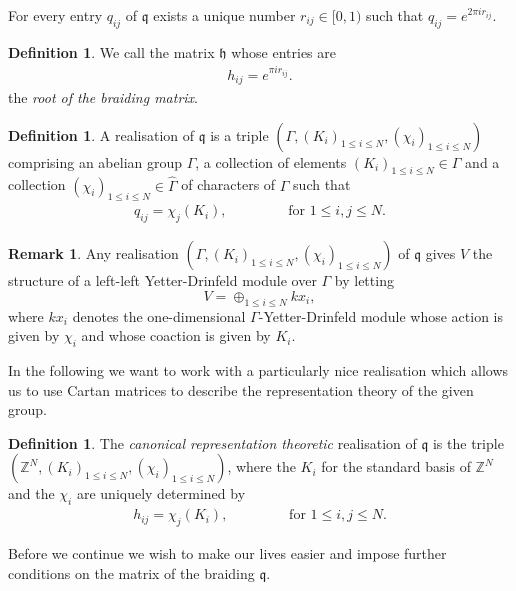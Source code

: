 \documentclass{amsart}
\theoremstyle{definition}
\newtheorem{definition}[theorem]{Definition}
\newtheorem*{remark}{Remark}
\begin{document}
For every entry $q_{ij}$ of $\mathfrak q$ exists a unique number $r_{ij}\in [0,1)$ such that $q_{ij}= e^{2\pi i r_{ij}}$. 

\begin{definition}
	We call the matrix $\mathfrak h$ whose entries are
	\begin{align}
		h_{ij} =  e^{\pi i r_{ij}}.
	\end{align}
	the \emph{root of the braiding matrix}. 
\end{definition}

\begin{definition}
	A realisation of $\mathfrak q$ is a triple $(\Gamma, (K_i)_{1\leq i \leq N}, (\chi_i)_{1 \leq i \leq N})$ comprising an abelian group $\Gamma$, a collection of elements $(K_i)_{1 \leq i \leq N} \in \Gamma$ and a collection  $(\chi_i)_{1 \leq i \leq N} \in \widehat \Gamma$ of characters of $\Gamma$ such that
	\begin{align}
		q_{ij} = \chi_j(K_i), \qquad \qquad \text{ for } 1 \leq i,j \leq N.
	\end{align}
\end{definition}

\begin{remark}
	Any realisation $(\Gamma, (K_i)_{1\leq i \leq N}, (\chi_i)_{1 \leq i \leq N})$ of $\mathfrak q$ gives $V$ the structure of a left-left Yetter-Drinfeld module over $\Gamma$ by letting
	$$
		V= \oplus_{1 \leq i \leq N} kx_i,
	$$
	where $kx_i$ denotes the one-dimensional $\Gamma$-Yetter-Drinfeld module whose action is given by $\chi_i$ and whose coaction is given by $K_i$.
\end{remark}

In the following we want to work with a particularly nice realisation which allows us to use Cartan matrices to describe the representation theory of the given group.
\begin{definition}
	The \emph{canonical representation theoretic} realisation of $\mathfrak q$ is the triple $(\mathbb Z^N,(K_i)_{1\leq i \leq N}, (\chi_i)_{1 \leq i \leq N})$, where
	the $K_i$ for the standard basis of $\mathbb Z^N$ and the $\chi_i$ are uniquely determined by
	\begin{align}
		h_{ij} = \chi_j(K_i), \qquad \qquad \text{ for } 1 \leq i,j \leq N.
	\end{align}
\end{definition}

Before we continue we wish to make our lives easier and impose further conditions on the matrix of the braiding $\mathfrak q$.
\end{document}
